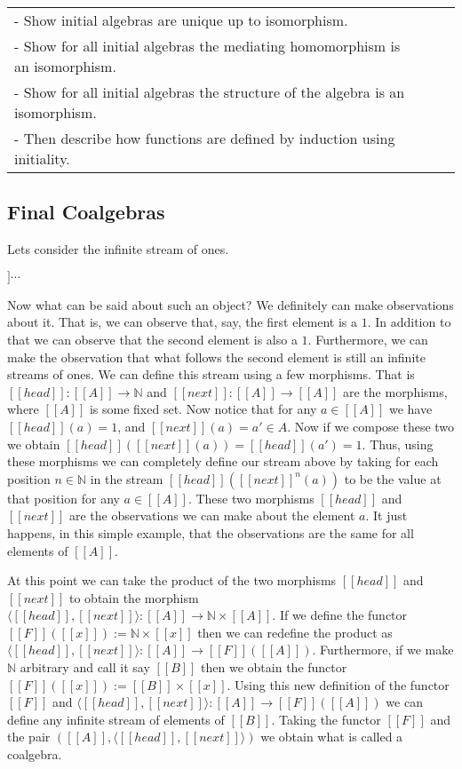 \begin{tabular}{lll}
  - Show initial algebras are unique up to isomorphism.\\
  - Show for all initial algebras the mediating homomorphism is an isomorphism.\\
  - Show for all initial algebras the structure of the algebra is an isomorphism.\\
  - Then describe how functions are defined by induction using initiality.\\
\end{tabular}

\subsection{Final Coalgebras}
\label{subsec:final_coalgebras}
Lets consider the infinite stream of ones. 
\begin{center}
  \begin{math}
    [[1 :: 1 :: 1 :: 1]] \cdots
  \end{math}
\end{center}
Now what can be said about such an object?  We definitely can make observations about it.
That is, we can observe that, say, the first element is a $1$.  In addition to that we can 
observe that the second element is also a $1$.  Furthermore, we can make the observation 
that what follows the second element is still an infinite streams of ones.
We can define this stream using a few morphisms.  That is $[[head]] : [[A]] \to \mathbb{N}$ and
$[[next]] : [[A]] \to [[A]]$ are the morphisms, where $[[A]]$ is some fixed set.
Now notice that for any $a \in [[A]]$ we have $[[head]](a) = 1$, and 
$[[next]](a) = a' \in A$.  Now if we compose these two we obtain 
$[[head]]([[next]](a)) = [[head]](a') = 1$.  Thus, using these morphisms we can completely
define our stream above by taking for each position $n \in \mathbb{N}$ in the stream 
$[[head]]([[next]]^{n}(a))$ to be the value at that position for any $a \in [[A]]$.  These
two morphisms $[[head]]$ and $[[next]]$ are the observations we can make about the element 
$a$. It just happens, in this simple example, that the observations are the same for all 
elements of $[[A]]$.

At this point we can take the product of the two morphisms $[[head]]$ and $[[next]]$ to
obtain the morphism $\langle [[head]],[[next]] \rangle : [[A]] \to \mathbb{N} \times [[A]]$.
If we define the functor $[[F]]([[x]]) := \mathbb{N} \times [[x]]$ then we can redefine the
product as $\langle [[head]],[[next]] \rangle : [[A]] \to [[F]]([[A]])$.  Furthermore,
if we make $\mathbb{N}$ arbitrary and call it say $[[B]]$ then we obtain 
the functor $[[F]]([[x]]) := [[B]] \times [[x]]$.  Using this new definition of the functor
$[[F]]$ and $\langle [[head]],[[next]] \rangle : [[A]] \to [[F]]([[A]])$ we can define any
infinite stream of elements of $[[B]]$.  Taking the functor $[[F]]$ and the pair
$([[A]], \langle [[head]], [[next]] \rangle)$ we obtain what is called a coalgebra.

